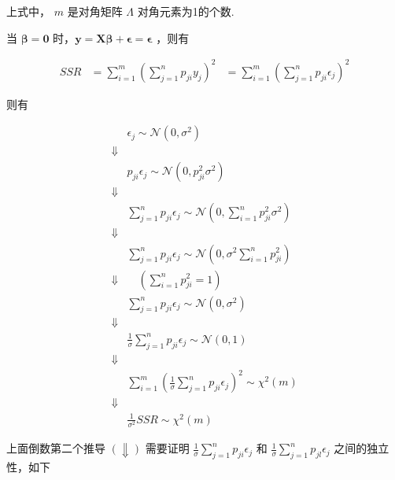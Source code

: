 \documentclass[UTF8]{ctexart}
\begin{document}
    上式中， $ m $ 是对角矩阵 $ \boldsymbol{\varLambda} $ 对角元素为1的个数.
    
    
    当 $ \boldsymbol{\beta} = \boldsymbol{0}$ 时，$ \boldsymbol{y} = \boldsymbol{X} \boldsymbol{\beta} + \boldsymbol{\epsilon} = \boldsymbol{\epsilon} $ ，则有
    
    \begin{equation}
    	\begin{aligned}
    		SSR & = \sum_{i=1}^{m}{(\sum_{j=1}^{n}{p_{ji} y_{j}})^2}
    		& = \sum_{i=1}^{m}{(\sum_{j=1}^{n}{p_{ji} \epsilon_{j}})^2}
    	\end{aligned}
    \end{equation}

    则有
    
    \begin{equation}
        \begin{aligned}
        	& \epsilon_{j} \sim \mathcal{N}(0, \sigma^2) \\
        	\Downarrow & \\
        	& p_{ji} \epsilon_{j} \sim \mathcal{N}(0, p_{ji}^2 \sigma^2) \\
        	\Downarrow & \\
        	& \sum_{j=1}^{n}{p_{ji} \epsilon_{j}} \sim \mathcal{N}(0, \sum_{i=1}^{n}p_{ji}^2 \sigma^2) \\
        	\Downarrow & \\
        	& \sum_{j=1}^{n}{p_{ji} \epsilon_{j}} \sim \mathcal{N}(0, \sigma^2 \sum_{i=1}^{n}p_{ji}^2) \\
        	\Downarrow & \quad (\sum_{i=1}^{n}p_{ji}^2 = 1) \\
        	& \sum_{j=1}^{n}{p_{ji} \epsilon_{j}} \sim \mathcal{N}(0, \sigma^2) \\
        	\Downarrow & \\
        	& \frac{1}{\sigma} \sum_{j=1}^{n}{p_{ji} \epsilon_{j}} \sim \mathcal{N}(0, 1) \\
        	\Downarrow & \\ 
        	& \sum_{i=1}^{m}{(\frac{1}{\sigma} \sum_{j=1}^{n}{p_{ji} \epsilon_{j}})^2} \sim \mathcal{\chi}^2(m) \\
        	\Downarrow & \\
        	& \frac{1}{\sigma^2} SSR \sim \mathcal{\chi}^2(m)
        \end{aligned}
    \end{equation}

    上面倒数第二个推导 $ (\Downarrow) $ 需要证明 $ \frac{1}{\sigma} \sum_{j=1}^{n}{p_{ji} \epsilon_{j}} $ 和 $ \frac{1}{\sigma} \sum_{j=1}^{n}{p_{jl} \epsilon_{j}} $ 之间的独立性，如下
    
\end{document}
